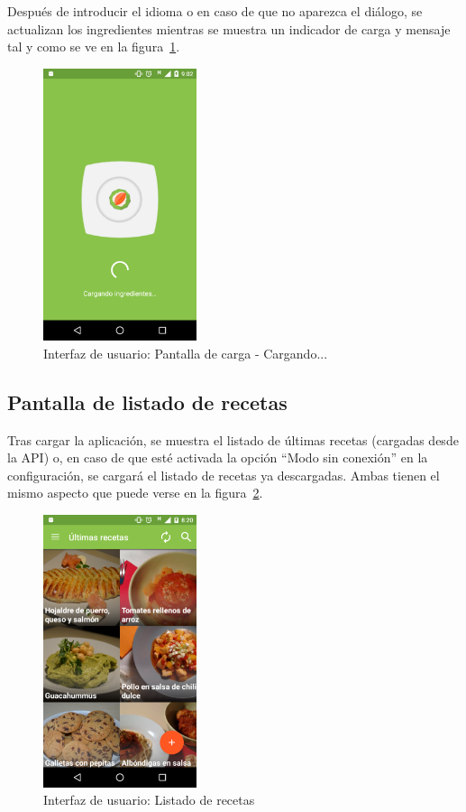 Después de introducir el idioma o en caso de que
no aparezca el diálogo, se actualizan los ingredientes mientras se muestra un
indicador de carga y mensaje tal y como se ve en la figura~\ref{fig:captura_02}.

\begin{figure}[htbp]
  \centering
  \includegraphics[width=0.4\textwidth]{cap5/img/captura_02}
  \caption{Interfaz de usuario: Pantalla de carga - Cargando...}
  \label{fig:captura_02}
\end{figure}


\subsection{Pantalla de listado de recetas}

Tras cargar la aplicación, se muestra el listado de últimas recetas (cargadas
desde la API) o, en caso de que esté activada la opción ``Modo sin conexión'' en
la configuración, se cargará el listado de recetas ya descargadas. Ambas tienen
el mismo aspecto que puede verse en la figura~\ref{fig:captura_03}.

\begin{figure}[htbp]
  \centering
  \includegraphics[width=0.4\textwidth]{cap5/img/captura_03}
  \caption{Interfaz de usuario: Listado de recetas}
  \label{fig:captura_03}
\end{figure}

